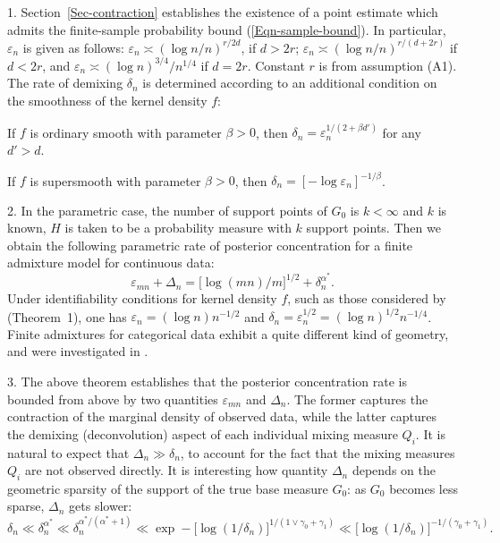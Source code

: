 \documentclass[MSNbibl,number,citesort]{arxbj}
\newcommand{\eqref}[1]{(\ref{#1})}
\newcommand{\epsmn}{\varepsilon_{mn}}
\begin{document}
\begin{remarks*}
1. Section~\ref{Sec-contraction} establishes
the existence of a point estimate which admits the
finite-sample probability bound \eqref{Eqn-sample-bound}.
In particular, $\varepsilon_n$ is given as follows:
$\varepsilon_n \asymp(\log n/n)^{r/2d}$, if $d > 2r$;
$\varepsilon_n \asymp(\log n/n)^{r/(d+2r)}$ if $d<2r$, and
$\varepsilon_n \asymp(\log n)^{3/4}/n^{1/4}$ if $d=2r$. Constant $r$
is from assumption (A1). The rate of demixing $\delta_n$ is determined
according to an additional condition on
the smoothness of the kernel density $f$:
%
\begin{longlist}[(a)]
%
\item[(a)] If $f$
is ordinary smooth with parameter $\beta> 0$,
then $\delta_n = \varepsilon_n^{{1}/{(2+\beta d')}}$ for any
$d' > d$.
%
\item[(b)] If $f$ is supersmooth with parameter $\beta> 0$, then
$\delta_n = [-\log\varepsilon_n]^{-1/\beta}$.
\end{longlist}

2. In the parametric case,
the number of support points of $G_0$ is $k < \infty$ and
$k$ is known, $H$ is taken to be a probability measure with
$k$ support points. Then we obtain
the following parametric rate of posterior concentration for a
finite admixture model for continuous data:
%
\[
\epsmn+ \Delta_n = \bigl[\log(mn)/m \bigr]^{1/2} +
\delta_n^{{\alpha^*}}.
\]
%
Under identifiability
conditions for kernel density $f$, such as those considered
by \cite{Nguyen-11} (Theorem~1), one has
$\varepsilon_n = (\log n)n^{-1/2}$ and
$\delta_n = \varepsilon_n^{1/2} = (\log n)^{1/2}n^{-1/4}$.
Finite admixtures for categorical data exhibit a quite
different kind of geometry, and were investigated
in \cite{Nguyen-admixture}.

3. The above theorem establishes that the posterior concentration rate
is bounded from above by two quantities $\epsmn$ and $\Delta_n$.
The former captures the contraction of the marginal density
of observed data, while the latter captures the demixing
(deconvolution) aspect of each individual mixing measure
$Q_i$.
It is natural to expect that $\Delta_n \gg\delta_n$,
to account for the fact that the mixing measures $Q_i$ are not observed
directly. It is interesting how quantity $\Delta_n$ depends on
the geometric sparsity of the support of the true base measure $G_0$:
as
$G_0$ becomes less sparse, $\Delta_n$ gets slower:
%
\[
\delta_n \ll\delta_n^{{\alpha^*}} \ll
\delta_n^{{\alpha^*}
/({\alpha^*}+1)} \ll\exp- \bigl[\log(1/\delta_n)
\bigr]^{1/(1\vee\gamma_0 +\gamma_1)} \ll \bigl[\log(1/\delta _n)
\bigr]^{-1/(\gamma_0+\gamma_1)}.
\]
%
\end{remarks*}
\end{document}
